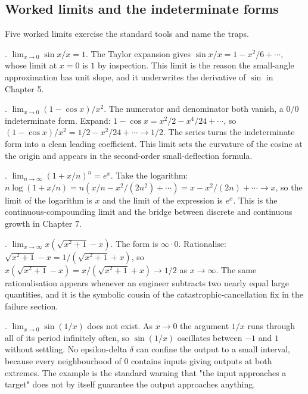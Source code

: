 \subsection{Worked limits and the indeterminate forms}

Five worked limits exercise the standard tools and name the traps.

. $\lim_{x \to 0} \sin x / x =
1$. The Taylor expansion gives $\sin x / x = 1 - x^{2}/6 + \cdots$,
whose limit at $x = 0$ is $1$ by inspection. This limit is the reason
the small-angle approximation has unit slope, and it underwrites the
derivative of $\sin$ in Chapter 5.

. $\lim_{x \to 0} (1 - \cos x)/x^{2}$.
The numerator and denominator both vanish, a $0/0$ indeterminate form.
Expand: $1 - \cos x = x^{2}/2 - x^{4}/24 + \cdots$, so $(1 - \cos
x)/x^{2} = 1/2 - x^{2}/24 + \cdots \to 1/2$. The series turns the
indeterminate form into a clean leading coefficient. This limit sets
the curvature of the cosine at the origin and appears in the
second-order small-deflection formula.

. $\lim_{n \to \infty} (1 + x/n)^{n}
= e^{x}$. Take the logarithm: $n \log(1 + x/n) = n (x/n - x^{2}/(2
n^{2}) + \cdots) = x - x^{2}/(2n) + \cdots \to x$, so the limit of the
logarithm is $x$ and the limit of the expression is $e^{x}$. This is the
continuous-compounding limit and the bridge between discrete and
continuous growth in Chapter 7.

. $\lim_{x \to \infty} x (\sqrt{x^{2} + 1}
- x)$. The form is $\infty \cdot 0$. Rationalise: $\sqrt{x^{2} + 1} - x
= 1/(\sqrt{x^{2} + 1} + x)$, so $x (\sqrt{x^{2} + 1} - x) = x/(\sqrt{x^{2}
+ 1} + x) \to 1/2$ as $x \to \infty$. The same rationalisation appears
whenever an engineer subtracts two nearly equal large quantities, and it
is the symbolic cousin of the catastrophic-cancellation fix in the
failure section.

. $\lim_{x \to 0} \sin(1/x)$ does
not exist. As $x \to 0$ the argument $1/x$ runs through all of its
period infinitely often, so $\sin(1/x)$ oscillates between $-1$ and $1$
without settling. No epsilon-delta $\delta$ can confine the output to a
small interval, because every neighbourhood of $0$ contains inputs
giving outputs at both extremes. The example is the standard warning
that "the input approaches a target" does not by itself guarantee the
output approaches anything.

